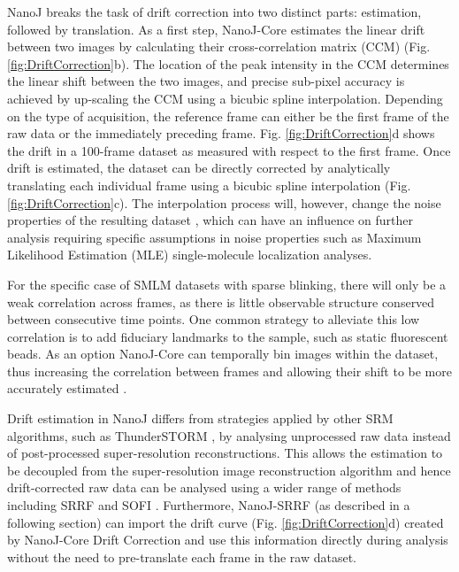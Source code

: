  NanoJ breaks the task of drift correction into two distinct parts: estimation, followed by translation. As a first step, NanoJ-Core estimates the linear drift between two images by calculating their cross-correlation matrix (CCM) (Fig. \ref{fig:DriftCorrection}b). The location of the peak intensity in the CCM determines the linear shift between the two images, and precise sub-pixel accuracy is achieved by up-scaling the CCM using a bicubic spline interpolation. Depending on the type of acquisition, the reference frame can either be the first frame of the raw data or the immediately preceding frame. Fig. \ref{fig:DriftCorrection}d shows the drift in a 100-frame dataset as measured with respect to the first frame. Once drift is estimated, the dataset can be directly corrected by analytically translating each individual frame using a bicubic spline interpolation (Fig. \ref{fig:DriftCorrection}c). The interpolation process will, however, change the noise properties of the resulting dataset \cite{blaysat2016effect}, which can have an influence on further analysis requiring specific assumptions in noise properties such as Maximum Likelihood Estimation (MLE) single-molecule localization analyses.
 
 For the specific case of SMLM datasets with sparse blinking, there will only be a weak correlation across frames, as there is little observable structure conserved between consecutive time points. One common strategy to alleviate this low correlation is to add fiduciary landmarks to the sample, such as static fluorescent beads. As an option NanoJ-Core can temporally bin images within the dataset, thus increasing the correlation between frames and allowing their shift to be more accurately estimated \cite{mlodzianoski2011sample}. 

 Drift estimation in NanoJ differs from strategies applied by other SRM algorithms, such as ThunderSTORM \cite{ovesny2014thunderstorm}, by analysing unprocessed raw data instead of post-processed super-resolution reconstructions. This allows the estimation to be decoupled from the super-resolution image reconstruction algorithm and hence drift-corrected raw data can be analysed using a wider range of methods including SRRF and SOFI \cite{dertinger2009fast}. Furthermore, NanoJ-SRRF (as described in a following section) can import the drift curve (Fig. \ref{fig:DriftCorrection}d) created by NanoJ-Core Drift Correction and use this information directly during analysis without the need to pre-translate each frame in the raw dataset.

